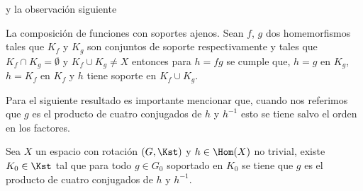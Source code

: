 y la observación siguiente

\begin{ob}\label{ob:efecto_soporte_2}
La composición de funciones con soportes ajenos. Sean $f$, $g$ dos homemorfismos tales que $K_f$ y $K_g$ son conjuntos de soporte respectivamente y tales que  $K_f \cap K_g = \emptyset$ y $K_f \cup K_g \neq X$ entonces para $h=fg$ se cumple que, $h=g$ en  $ K_g$, $h=K_f$ en $K_f$ y $h$ tiene soporte en $K_f \cup K_g$.
\end{ob}

\begin{nt}
Para el siguiente resultado es importante mencionar que, cuando nos referimos que $g$ es el producto de cuatro conjugados de $h$ y $h^{-1}$ esto se tiene salvo el orden en los factores. 
\end{nt}

\begin{lm}\label{lm:lema_1}
Sea $X$ un espacio con rotación $(G,\Kst)$ y $h \in \Hom(X)$ no trivial, existe $K_0 \in \Kst$ tal que para todo $g \in G_0$ soportado en $K_0$ se tiene que $g$ es el producto de cuatro conjugados de $h$ y $h^{-1}$. 
\end{lm}



